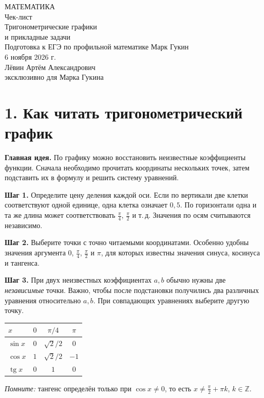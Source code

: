 \documentclass[a4paper,11pt]{article}
\newcommand{\key}[1]{\textcolor{accent}{\textbf{#1}}}
\begin{document}
\thispagestyle{empty}
\begin{center}
\vspace*{26mm}
{\small\color{accent}\MakeUppercase{Математика}}\\[17mm]
{\Huge Чек-лист}\\[12mm]
{\LARGE\color{accent} Тригонометрические графики\\[2mm] и прикладные задачи}\\[18mm]
{\normalsize Подготовка к ЕГЭ по профильной математике}
\vfill
{\large Марк Гукин}\\[8mm]
{6 ноября 2026 г.}\\[19mm]
{\small Лёвин Артём Александрович}\\[2mm]
{\small эксклюзивно для Марка Гукина}\\[17mm]
\vspace*{6mm}
\end{center}
\clearpage
\section*{1. Как читать тригонометрический график}
\key{Главная идея.} По графику можно восстановить неизвестные коэффициенты функции. Сначала необходимо прочитать координаты нескольких точек, затем подставить их в формулу и решить систему уравнений.

\textbf{Шаг 1.} Определите цену деления каждой оси. Если по вертикали две клетки соответствуют одной единице, одна клетка означает $0{,}5$. По горизонтали одна и та же длина может соответствовать $\frac{\pi}{4}$, $\frac{\pi}{2}$ и т.\,д. Значения по осям считываются независимо.

\textbf{Шаг 2.} Выберите точки с точно читаемыми координатами. Особенно удобны значения аргумента $0$, $\frac{\pi}{4}$, $\frac{\pi}{2}$ и $\pi$, для которых известны значения синуса, косинуса и тангенса.

\textbf{Шаг 3.} При двух неизвестных коэффициентах $a,b$ обычно нужны две \emph{независимые} точки. Важно, чтобы после подстановки получились два различных уравнения относительно $a,b$. При совпадающих уравнениях выберите другую точку.

\begin{center}
\renewcommand{\arraystretch}{1.28}
\begin{tabular}{@{}lccc@{}}\toprule
$x$ & $0$ & $\pi/4$ & $\pi$ \\ \midrule
$\sin x$ & $0$ & $\sqrt2/2$ & $0$ \\
$\cos x$ & $1$ & $\sqrt2/2$ & $-1$ \\
$\operatorname{tg}x$ & $0$ & $1$ & $0$ \\ \bottomrule
\end{tabular}
\end{center}
\textit{Помните:} тангенс определён только при $\cos x\neq0$, то есть $x\neq\frac\pi2+\pi k$, $k\in\mathbb Z$.
\end{document}
